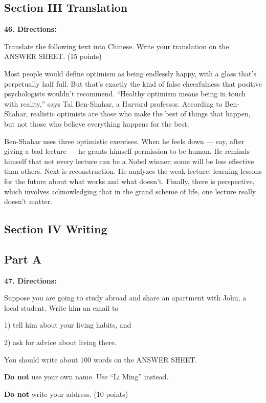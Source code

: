 \documentclass[UTF8,11pt]{ctexart}
\begin{document}
\subsection*{\textbf{Section III Translation}}


\textbf{46. Directions:}


Translate the following text into Chinese. Write your translation on the ANSWER SHEET. (15 points)


Most people would define optimism as being endlessly happy, with a glass that’s perpetually half full. But that’s exactly the kind of false cheerfulness that positive psychologists wouldn’t recommend. “Healthy optimism means being in touch with reality,” says Tal Ben-Shahar, a Harvard professor. According to Ben-Shahar, realistic optimists are those who make the best of things that happen, but not those who believe everything happens for the best.


Ben-Shahar uses three optimistic exercises. When he feels down — say, after giving a bad lecture — he grants himself permission to be human. He reminds himself that not every lecture can be a Nobel winner; some will be less effective than others. Next is reconstruction. He analyzes the weak lecture, learning lessons for the future about what works and what doesn’t. Finally, there is perspective, which involves acknowledging that in the grand scheme of life, one lecture really doesn’t matter.


\subsection*{\textbf{Section IV Writing}}


\subsection*{\textbf{Part A}}


\textbf{47. Directions:}


Suppose you are going to study abroad and share an apartment with John, a local student. Write him an email to


1) tell him about your living habits, and


2) ask for advice about living there.


You should write about 100 words on the ANSWER SHEET.


\textbf{Do not} use your own name. Use “Li Ming” instead.


\textbf{Do not} write your address. (10 points)
\end{document}
